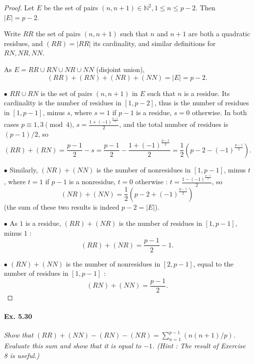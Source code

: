 \documentclass[11pt,a4paper]{article}
\newcommand{\N}{\mathbb{N}}
\begin{document}
\begin{proof}
Let $E$ be the set of pairs $(n,n+1)\in \N^2, 1 \leq n \leq p-2$. Then $\vert E \vert = p-2$.  

Write $RR$ the set of pairs $(n,n+1)$ such that $n$ and $n+1$ are both a quadratic residues, and $(RR) = \vert RR \vert$ its cardinality, and similar definitions for $RN,NR,NN$.

As $E = RR \cup RN \cup NR \cup NN$ (disjoint union), 
$$(RR) +(RN) + (NR)+ (NN) = \vert E \vert = p-2.$$

$\bullet$ $RR \cup RN$ is the set of pairs $(n,n+1)$ in $E$ such that $n$ is a residue. Its cardinality is the number of residues in $[1,p-2]$, thus is the number of residues in $[1,p-1]$, minus $s$, where $s = 1$ if $p-1$ is a residue, $s=0$ otherwise. In both cases $p \equiv 1,3 \pmod 4$, $s = \frac{1+(-1)^{\frac{p-1}{2}}}{2}$, and the total number of residues is $(p-1)/2$, so
$$(RR)+(RN) = \frac{p-1}{2} -s = \frac{p-1}{2} -\frac{1+(-1)^{\frac{p-1}{2}}}{2} = \frac{1}{2}(p - 2 - (-1)^{\frac{p-1}{2}}).$$

$\bullet$ Similarly, $(NR)+(NN)$ is the number of nonresidues in $[1,p-1]$, minus $t$, where $t=1$ if $p-1$ is a nonresidue, $t=0$ otherwise : $t =\frac{1-(-1)^{\frac{p-1}{2}}}{2}$, so
$$(NR)+(NN) = \frac{1}{2}(p - 2 + (-1)^{\frac{p-1}{2}})$$
(the sum of these two results is indeed $p-2 = \vert E \vert$).

$\bullet$ As $1$ is a residue, $(RR)+(NR)$ is the number of residues in $[1,p-1]$, minus $1$ :
$$(RR)+(NR) = \frac{p-1}{2} - 1.$$

$\bullet$ $(RN)+(NN)$ is the number of nonresidues in $[2,p-1]$, equal to the number of residues in $[1,p-1]$ :
$$(RN)+(NN) = \frac{p-1}{2}.$$
\end{proof}

\paragraph{Ex. 5.30}

{\it Show that $(RR) + (NN) - (RN) - (NR) = \sum_{n=1}^{p-1}(n(n+1)/p)$. Evaluate this sum and show that it is equal to $-1$. (Hint : The result of Exercise 8 is useful.)
}
\end{document}
